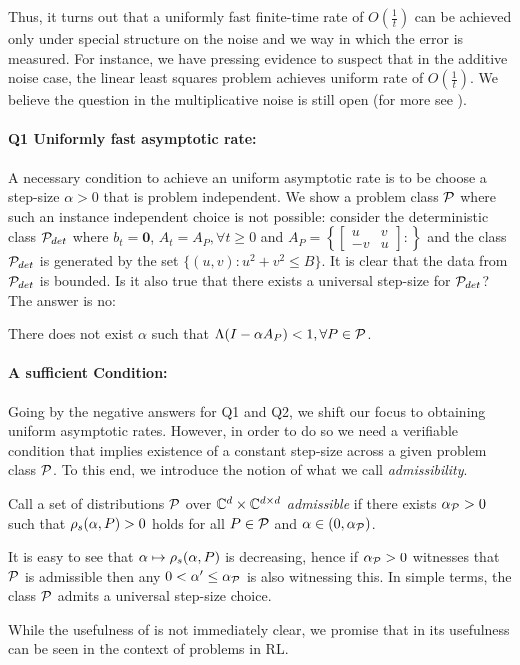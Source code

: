 Thus, it turns out that a uniformly fast finite-time rate of $O(\frac{1}{t})$ can be achieved only under special structure on the noise and we way in which the error is measured. For instance, we have pressing evidence to suspect that in the additive noise case, the linear least squares problem achieves uniform rate of $O(\frac{1}{t})$. We believe the question in the multiplicative noise is still open (for more see ).
\paragraph{Q1 Uniformly fast asymptotic rate:} A necessary condition to achieve an uniform asymptotic rate is to be choose a step-size $\alpha>0$ that is problem independent. 
We show a problem class $\P$ where such an instance independent choice is not possible: consider the deterministic class $\P_{det}$ where $b_t=\mathbf{0}$, $A_t=A_P, \forall t\geq 0$ and $A_P=\left\{\left[\begin{matrix} u &v \\ -v & u\end{matrix}\right] : \right\}$ and the class $\P_{det}$ is generated by the set $\{(u,v) : u^2+v^2\leq B\}$. It is clear that the data from $\P_{det}$ is bounded. Is it also true that there exists a universal step-size for $\P_{det}$? The answer is no:  
\begin{proposition}\label{prop:unistep}
There does not exist $\alpha$ such that $\Lambda(I-\alpha A_P)<1, \forall P\in \P$. 
\end{proposition}

\paragraph{A sufficient Condition:} Going by the negative answers for Q1 and Q2, we shift our focus to obtaining uniform asymptotic rates. However, in order to do so we need a verifiable condition that implies existence of a constant step-size across a given problem class $\P$. To this end, we introduce the notion of what we call \emph{admissibility}.
\begin{definition}\label{def:admis}
Call a set of distributions $\P$ over $\C^{d}\times \C^{\dcd}$
\emph{admissible} if there exists $\alpha_{\P}>0$ such that
$\rhos{P}>0$ holds for all $P\in \P$ and $\alpha\in(0,\alpha_{\P})$.
\end{definition}
It is easy to see that $\alpha \mapsto \rhos{P}$ is decreasing,
hence if $\alpha_{\P}>0$ witnesses that $\P$ is admissible
then any $0<\alpha'\le \alpha_{\P}$ is also witnessing this. In simple terms, the class $\P$ admits a universal step-size choice. 

While the usefulness of  is not immediately clear, we promise that in  its usefulness can be seen in the context of problems in RL. 